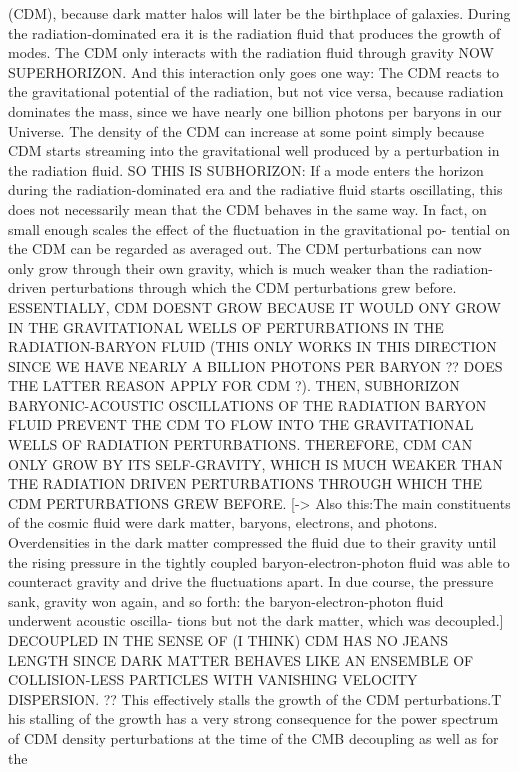 \begin{description}
(CDM), because dark matter halos will later be the birthplace of galaxies. During the
radiation-dominated era it is the radiation fluid that produces the growth of modes.
The CDM only interacts with the radiation fluid through gravity NOW SUPERHORIZON. And this interaction
only goes one way: The CDM reacts to the gravitational potential of the radiation, but
not vice versa, because radiation dominates the mass, since we have nearly one billion photons per baryons in our Universe. The density of the CDM can
increase at some point simply because CDM starts streaming into the gravitational
well produced by a perturbation in the radiation fluid. SO THIS IS SUBHORIZON: If a mode enters the horizon during the radiation-dominated era and the radiative fluid
starts oscillating, this does not necessarily mean that the CDM behaves in the same
way. In fact, on small enough scales the effect of the fluctuation in the gravitational po-
tential on the CDM can be regarded as averaged out. The CDM perturbations can now
only grow through their own gravity, which is much weaker than the radiation-driven
perturbations through which the CDM perturbations grew before. ESSENTIALLY, CDM DOESNT GROW BECAUSE IT WOULD ONY GROW IN THE GRAVITATIONAL WELLS OF PERTURBATIONS IN THE RADIATION-BARYON FLUID (THIS ONLY WORKS IN THIS DIRECTION SINCE WE HAVE NEARLY A BILLION PHOTONS PER BARYON ?? DOES THE LATTER REASON APPLY FOR CDM ?). THEN,  SUBHORIZON BARYONIC-ACOUSTIC OSCILLATIONS OF THE RADIATION BARYON FLUID PREVENT THE CDM TO FLOW INTO THE GRAVITATIONAL WELLS OF RADIATION PERTURBATIONS. THEREFORE, CDM CAN ONLY GROW BY ITS SELF-GRAVITY, WHICH IS MUCH WEAKER THAN THE RADIATION DRIVEN PERTURBATIONS THROUGH WHICH THE CDM PERTURBATIONS GREW BEFORE. [-> Also this:The main constituents of the cosmic fluid were dark
matter, baryons, electrons, and photons. Overdensities
in the dark matter compressed the fluid due to their
gravity until the rising pressure in the tightly coupled
baryon-electron-photon fluid was able to counteract
gravity and drive the fluctuations apart. In due course,
the pressure sank, gravity won again, and so forth: the
baryon-electron-photon fluid underwent acoustic oscilla-
tions but not the dark matter, which was decoupled.] DECOUPLED IN THE SENSE OF (I THINK) CDM HAS NO JEANS LENGTH SINCE DARK MATTER BEHAVES LIKE AN ENSEMBLE OF COLLISION-LESS PARTICLES WITH VANISHING VELOCITY DISPERSION. ?? This effectively
stalls the growth of the CDM perturbations.T his stalling of the growth has a very strong consequence for the power spectrum
of CDM density perturbations at the time of the CMB decoupling as well as for the

\end{description}
